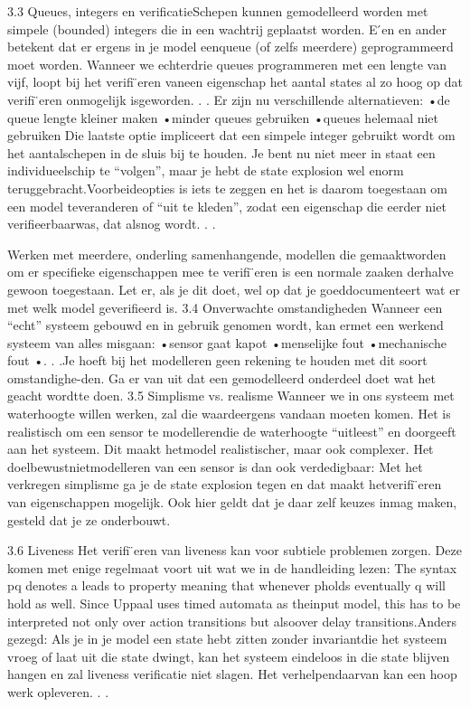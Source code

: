 3.3	Queues, integers en verificatieSchepen kunnen gemodelleerd worden met simpele (bounded) integers die in een wachtrij geplaatst worden.  E ́en en ander betekent dat er ergens in je model eenqueue  (of  zelfs  meerdere)  geprogrammeerd  moet  worden.   Wanneer  we  echterdrie queues programmeren met een lengte van vijf,  loopt bij het verifi ̈eren vaneen  eigenschap  het  aantal  states  al  zo  hoog  op  dat  verifi ̈eren  onmogelijk  isgeworden. . . 
Er zijn nu verschillende alternatieven: 
•de queue lengte kleiner maken 
•minder queues gebruiken 
•queues helemaal niet gebruiken 
Die laatste optie impliceert dat een simpele integer gebruikt wordt om het aantalschepen in de sluis bij te houden.  Je bent nu niet meer in staat een individueelschip  te  “volgen”,  maar  je  hebt  de  state  explosion  wel  enorm  teruggebracht.Voorbeideopties is iets te zeggen en het is daarom toegestaan om een model teveranderen of “uit te kleden”, zodat een eigenschap die eerder niet verifieerbaarwas, dat alsnog wordt. . . 

Werken  met  meerdere,  onderling  samenhangende,  modellen  die  gemaaktworden  om  er  specifieke  eigenschappen  mee  te  verifi ̈eren  is  een  normale  zaaken  derhalve  gewoon  toegestaan.   Let  er,  als  je  dit  doet,  wel  op  dat  je  goeddocumenteert wat er met welk model geverifieerd is. 
3.4	Onverwachte omstandigheden 
Wanneer  een  “echt”  systeem  gebouwd  en  in  gebruik  genomen  wordt,  kan  ermet een werkend systeem van alles misgaan: 
•sensor gaat kapot 
•menselijke fout 
•mechanische fout 
•. . .Je hoeft bij het modelleren geen rekening te houden met dit soort omstandighe-den.  Ga er van uit dat een gemodelleerd onderdeel doet wat het geacht wordtte doen. 
3.5	Simplisme vs.  realisme 
Wanneer  we  in  ons  systeem  met  waterhoogte  willen  werken,  zal  die  waardeergens vandaan moeten komen.  Het is realistisch om een sensor te modellerendie  de  waterhoogte  “uitleest”  en  doorgeeft  aan  het  systeem.   Dit  maakt  hetmodel realistischer, maar ook complexer. 
Het  doelbewustnietmodelleren  van  een  sensor  is  dan  ook  verdedigbaar: 
Met  het  verkregen  simplisme  ga  je  de  state  explosion  tegen  en  dat  maakt  hetverifi ̈eren van eigenschappen mogelijk.  Ook hier geldt dat je daar zelf keuzes inmag maken, gesteld dat je ze onderbouwt. 

3.6	Liveness 
Het  verifi ̈eren  van  liveness  kan  voor  subtiele  problemen  zorgen.   Deze  komen met enige regelmaat voort uit wat we in de handleiding lezen: 
The syntax pq denotes a leads to property meaning that whenever pholds eventually q will hold as well. Since Uppaal uses timed automata as theinput model, this has to be interpreted not only over action transitions but alsoover delay transitions.Anders  gezegd:   Als  je  in  je  model  een  state  hebt  zitten  zonder  invariantdie  het  systeem  vroeg  of  laat  uit  die  state  dwingt,  kan  het  systeem  eindeloos 
in die state blijven hangen en zal liveness verificatie niet slagen.  Het verhelpendaarvan kan een hoop werk opleveren. . . 

